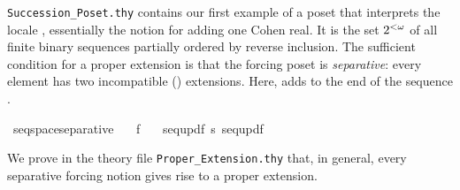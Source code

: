\verb|Succession_Poset.thy| contains our first example of a poset
that interprets the locale
, essentially the notion for
adding one Cohen real. It is the set $2^{<\omega}$ of all finite binary
sequences partially  ordered by reverse inclusion.
The sufficient condition for a proper extension is that
the forcing poset is \emph{separative}: every element has two
incompatible () extensions. Here,
adds  to the end of the sequence .

\begin{isabelle}
\isamarkupfalse%
\ seqspace{\isacharunderscore}separative{\isacharcolon}\isanewline
\ \ \ {\isachardoublequoteopen}f{\isasymin}{}{\isacharcircum}{\isacharless}{\isasymomega}{\isachardoublequoteclose}\isanewline
\ \ \ {\isachardoublequoteopen}seq{\isacharunderscore}upd{\isacharparenleft}f{\isacharcomma}{}{\isacharparenright}\ {\isasymbottom}s\ seq{\isacharunderscore}upd{\isacharparenleft}f{\isacharcomma}{}{\isacharparenright}{\isachardoublequoteclose}
\end{isabelle}
 
We prove in the theory file \verb|Proper_Extension.thy| that, in
general, every separative forcing notion gives rise to a proper
extension.

